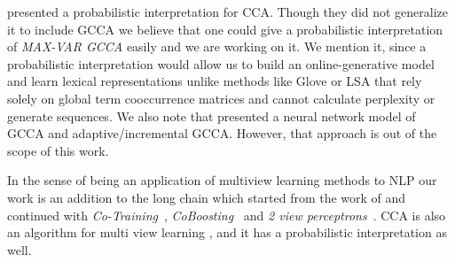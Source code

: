 \documentclass[11pt]{article}
\begin{document}
\cite{bach2005probabilistic} presented a probabilistic
interpretation for CCA. Though they did not generalize it to
include GCCA we believe that one could give a probabilistic
interpretation of \emph{MAX-VAR GCCA} easily and we are working on
it. We mention it, since a probabilistic
interpretation would allow us to build an online-generative model and learn
lexical representations unlike methods like Glove or LSA that rely
solely on global term cooccurrence matrices and cannot calculate
perplexity or generate sequences. We also note that
\cite{via2007learning} presented a neural network model of GCCA and 
adaptive/incremental GCCA. However, that approach is out of the scope
of this work.

In the sense of being an application of multiview
learning methods to NLP our work is an addition to the long chain which
started from the work of \cite{yarowsky1995unsupervised} and continued
with \emph{Co-Training}~\cite{blum1998combining}, \emph{CoBoosting}~\cite{collins1999unsupervised} and \emph{2 view
perceptrons}~\cite{brefeld2006efficient}.  CCA is also an algorithm
for multi view learning \cite{kakade2007multi,ganchevuai08}, and it
has a probabilistic interpretation \cite{bach2005probabilistic} as
well.
\end{document}
